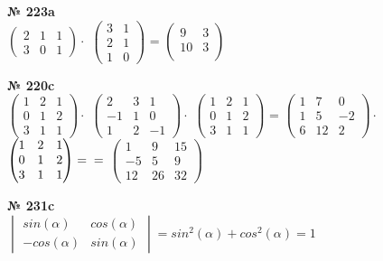\documentclass[12pt]{article}
\begin{document}
\vspace{.5cm}
{
	{\textbf{№ 223a} \vspace{.5cm}\\}
	$\begin{pmatrix}
		2 & 1 & 1 \\
		3 & 0 & 1
	\end{pmatrix} \cdot $
	$\begin{pmatrix}
		3 & 1 \\
		2 & 1 \\
		1 & 0
	\end{pmatrix}$ = 
	$\begin{pmatrix}
		9 & 3 \\
		10 & 3 \\
	\end{pmatrix}$
}

\vspace{.5cm}
{
	{\textbf{№ 220c} \vspace{.5cm}\\}
	$\begin{pmatrix}
		1 & 2 & 1 \\
		0 & 1 & 2 \\
		3 & 1 & 1
	\end{pmatrix} \cdot $
	$\begin{pmatrix}
		2 & 3 & 1 \\
		-1 & 1 & 0 \\
		1 & 2 & -1
	\end{pmatrix} \cdot $
	$\begin{pmatrix}
	1 & 2 & 1 \\
	0 & 1 & 2 \\
	3 & 1 & 1
	\end{pmatrix}$ = 
	$\begin{pmatrix}
		1 & 7 & 0 \\
		1 & 5 & -2 \\
		6 & 12 & 2
	\end{pmatrix} \cdot$
	$\begin{pmatrix}
	1 & 2 & 1 \\
	0 & 1 & 2 \\
	3 & 1 & 1
	\end{pmatrix} = \\ =$
	$\begin{pmatrix}
	1 & 9 & 15 \\
	-5 & 5 & 9 \\
	12 & 26 & 32
	\end{pmatrix}$
}

\vspace{.5cm}
{
	{\textbf{№ 231c} \vspace{.5cm}\\}
	$\begin{vmatrix}
		sin(\alpha) & cos(\alpha) \\
		-cos(\alpha) & sin(\alpha)
	\end{vmatrix} = sin^2(\alpha) + cos^2(\alpha) = 1$

}
\end{document}
